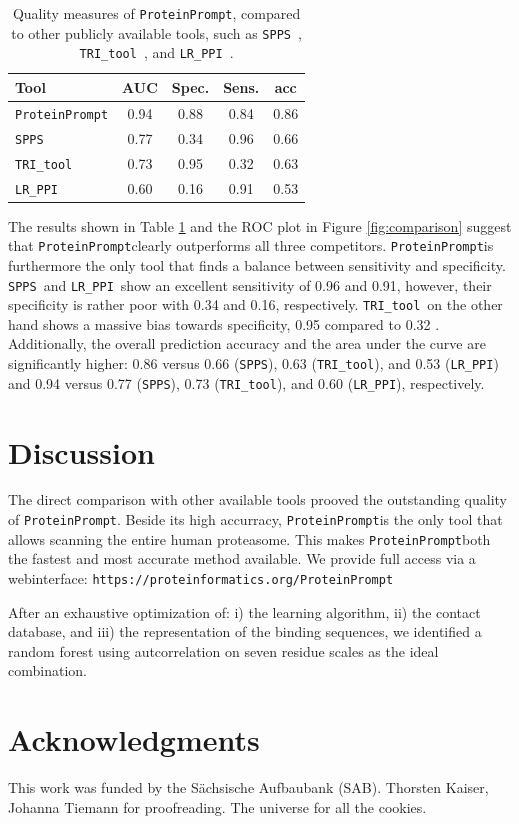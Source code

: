 \documentclass[preprint,3p,times,twocolumn]{elsarticle}
\newcommand{\url}[1]{\texttt{https://\small #1}}
\newcommand{\spps}{\texttt{SPPS}}
\newcommand{\tri}{\texttt{TRI\_tool}}
\newcommand{\lr}{\texttt{LR\_PPI}}
\newcommand{\tool}{\texttt{ProteinPrompt}\hspace{2pt}}
\newcommand{\website}{\url{proteinformatics.org/\tool}}
\begin{document}
\begin{table}
\begin{tabular}{|l |c | c | c | c |}
  \hline
  Tool  & AUC & Spec. & Sens. & acc \\
  \hline
  \tool  & 0.94 & 0.88 & 0.84 &  0.86 \\
  \hline
  \spps\  & 0.77 & 0.34 & 0.96 & 0.66 \\
  \hline
  \tri\  & 0.73 & 0.95 & 0.32 & 0.63 \\
  \hline
  \lr\  & 0.60 & 0.16 & 0.91 & 0.53  \\
  \hline
\end{tabular}
\caption{ Quality measures of \tool, compared to other publicly
  available tools, such as \spps\ \cite{Liu:2012}, \tri\
  \cite{Perovic:2017}, and \lr\ \cite{Pan:2010}. }
\label{table:comparison}
\end{table}

The results shown in Table \ref{table:comparison} and the ROC plot in
Figure \ref{fig:comparison} suggest that \tool clearly outperforms all
three competitors. \tool is furthermore the only tool that finds a
balance between sensitivity and specificity. \spps\ and \lr\ show an
excellent sensitivity of 0.96 and 0.91, however, their
specificity is rather poor with 0.34 and 0.16, respectively. \tri\ on
the other hand shows a massive bias towards specificity, 0.95 compared
to 0.32 . Additionally, the overall prediction accuracy and the area under the curve
are significantly higher: 0.86 versus 0.66 (\spps), 0.63 (\tri), and
0.53 (\lr) and 0.94 versus 0.77 (\spps), 0.73 (\tri), and 0.60 (\lr), respectively.


\section{Discussion}

The direct comparison with other available tools prooved the
outstanding quality of \tool. Beside its high accurracy, \tool is the
only tool that allows scanning the entire human proteasome. This makes
\tool both the fastest and most accurate method available. We provide
full access via a webinterface: \website

After an exhaustive optimization of: i) the learning algorithm, ii)
the contact database, and iii) the representation of the binding
sequences, we identified a random forest using autcorrelation on seven
residue scales as the ideal combination.



\section*{Acknowledgments}

This work was funded by the S\"achsische Aufbaubank (SAB).
Thorsten Kaiser, Johanna Tiemann for proofreading.
The universe for all the cookies.




\end{document}
